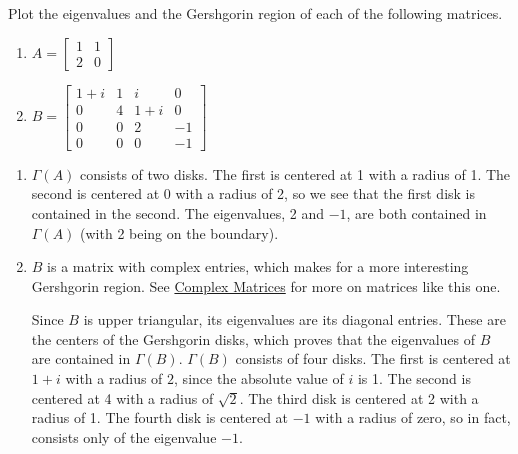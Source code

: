 \documentclass{ximera}
\begin{document}
\begin{example}\label{exa:plot_Gersh}
Plot the eigenvalues and the Gershgorin region of each of the following matrices.
\begin{enumerate}
    \item $A=\begin{bmatrix}
    1 & 1 \\
    2 & 0 \end{bmatrix}$
    \item $B=\begin{bmatrix}
    1+i & 1 & i & 0\\ 
    0 & 4 & 1+i & 0\\ 
    0 & 0 & 2 & -1 \\
    0 & 0 & 0 & -1\end{bmatrix}$
\end{enumerate}

\begin{explanation}

\begin{enumerate}
    \item $\Gamma(A)$ consists of two disks.  The first is centered at 1 with a radius of 1.  The second is centered at 0 with a radius of 2, so we see that the first disk is contained in the second.  The eigenvalues, 2 and $-1$, are both contained in $\Gamma(A)$ (with 2 being on the boundary).
    \item $B$ is a matrix with complex entries, which makes for a more interesting Gershgorin region.  See \href{https://ximera.osu.edu/oerlinalg/LinearAlgebra/RTH-0050/main}{Complex Matrices} for more on matrices like this one.
    
    Since $B$ is upper triangular, its eigenvalues are its diagonal entries.  These are the centers of the Gershgorin disks, which proves that the eigenvalues of $B$ are contained in $\Gamma(B)$.  $\Gamma(B)$ consists of four disks.  The first is centered at $1+i$ with a radius of $2$, since the absolute value of $i$ is 1.   The second is centered at 4 with a radius of $\sqrt{2}$.  The third disk is centered at 2 with a radius of 1.  The fourth disk is centered at $-1$ with a radius of zero, so in fact, consists only of the eigenvalue $-1$.
\end{enumerate}

\end{explanation}
\end{example}
\end{document}
